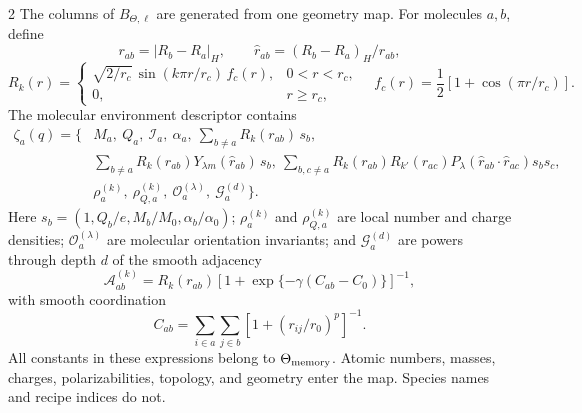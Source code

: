 \documentclass[10pt]{article}
\begin{document}
\begin{multicols}{2}
The columns of \(B_{\Theta,\ell}\) are generated from one geometry map.  For
molecules \(a,b\), define
\[
r_{ab}=|R_b-R_a|_H,\qquad
\widehat r_{ab}=(R_b-R_a)_H/r_{ab},
\]
\[
R_k(r)=
\begin{cases}
\sqrt{2/r_c}\,
\sin(k\pi r/r_c)\,f_c(r),&0<r<r_c,\\
0,&r\ge r_c,
\end{cases}
\quad
f_c(r)=\frac12[1+\cos(\pi r/r_c)].
\]
The molecular environment descriptor contains
\[
\begin{aligned}
\zeta_a(q)=\{&
M_a,\ Q_a,\ \mathcal I_a,\ \alpha_a,\ 
\sum_{b\ne a}R_k(r_{ab})\,s_b,\\
&\sum_{b\ne a}R_k(r_{ab})Y_{\lambda m}(\widehat r_{ab})\,s_b,\ 
\sum_{b,c\ne a}R_k(r_{ab})R_{k'}(r_{ac})
P_\lambda(\widehat r_{ab}\cdot\widehat r_{ac})s_bs_c,\\
&\rho_a^{(k)},\ \rho_{Q,a}^{(k)},\
\mathcal O_a^{(\lambda)},\ \mathcal G_a^{(d)}\}.
\end{aligned}
\]
Here \(s_b=(1,Q_b/e,M_b/M_0,\alpha_b/\alpha_0)\);
\(\rho_a^{(k)}\) and \(\rho_{Q,a}^{(k)}\) are local number and charge densities;
\(\mathcal O_a^{(\lambda)}\) are molecular orientation invariants; and
\(\mathcal G_a^{(d)}\) are powers through depth \(d\) of the smooth adjacency
\[
\mathcal A_{ab}^{(k)}=R_k(r_{ab})
\left[1+\exp\{-\gamma(C_{ab}-C_0)\}\right]^{-1},
\]
with smooth coordination
\[
C_{ab}=\sum_{i\in a}\sum_{j\in b}
\left[1+(r_{ij}/r_0)^p\right]^{-1}.
\]
All constants in these expressions belong to \(\Theta_{\rm memory}\).  Atomic
numbers, masses, charges, polarizabilities, topology, and geometry enter the map.
Species names and recipe indices do not.


\end{multicols}
\end{document}
